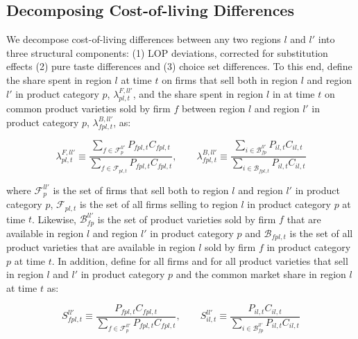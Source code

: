 \subsection{Decomposing Cost-of-living Differences}
We decompose cost-of-living differences between any two regions $l$ and $l'$ into three structural components: (1) LOP deviations, corrected for substitution effects (2) pure taste differences and (3) choice set differences. To this end, define the share spent in region $l$ at time $t$ on firms that sell both in region $l$ and region $l'$ in product category $p$, $\lambda^{F,ll'}_{pl,t}$, and the share spent in region $l$ in at time $t$ on common product varieties sold by firm $f$ between region $l$ and region $l'$ in product category $p$, $\lambda^{B,ll'}_{fpl,t}$, as: 
\begin{linenomath*}
    \begin{equation*}
        \lambda^{F,ll'}_{pl,t} \equiv  
            \frac{\sum_{f \in \mathcal{F}^{ll'}_p}P_{fpl,t}C_{fpl,t}}
                 {\sum_{f \in \mathcal{F}_{pl,t}} P_{fpl,t}C_{fpl,t}}, \qquad 
        \lambda^{B,ll'}_{fpl,t} \equiv  
                 \frac{\sum_{i \in \mathcal{B}^{ll'}_{fp}}P_{il,t}C_{il,t}}
                      {\sum_{i \in \mathcal{B}_{fpl,t}} P_{il,t}C_{il,t}}
    \end{equation*}
\end{linenomath*}
\noindent where $\mathcal{F}^{ll'}_p$ is the set of firms that sell both to region $l$ and region $l'$ in product category $p$, $\mathcal{F}_{pl,t}$ is the set of all firms selling to region $l$ in product category $p$ at time $t$. Likewise, $\mathcal{B}^{ll'}_{fp}$ is the set of product varieties sold by firm $f$ that are available in region $l$ and region $l'$ in product category $p$ and $\mathcal{B}_{fpl,t}$ is the set of all product varieties that are available in region $l$ sold by firm $f$ in product category $p$ at time $t$. In addition, define for all firms and for all product varieties that sell in region $l$ and $l'$ in product category $p$ and the common market share in region $l$ at time $t$ as: 
\begin{linenomath*}
    \begin{equation*}
        S^{ll'}_{fpl,t} \equiv  
            \frac{P_{fpl,t}C_{fpl,t}}
                 {\sum_{f \in \mathcal{F}^{ll'}_{p}} P_{fpl,t}C_{fpl,t}}, \qquad 
        S^{ll'}_{il,t} \equiv  
                 \frac{P_{il,t}C_{il,t}}
                      {\sum_{i \in \mathcal{B}^{ll'}_{fp}} P_{il,t}C_{il,t}}
    \end{equation*}
\end{linenomath*}
